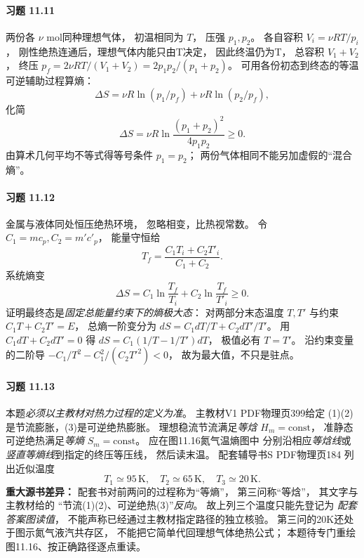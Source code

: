 \paragraph{习题 11.11}
两份各 \(\nu\) mol同种理想气体，
初温相同为 \(T\)，
压强 \(p_1,p_2\)。
各自容积 \(V_i=\nu RT/p_i\)，
刚性绝热连通后，理想气体内能只由T决定，
因此终温仍为T，
总容积 \(V_1+V_2\)，
终压
\(p_f=2\nu RT/(V_1+V_2)
 =2p_1p_2/(p_1+p_2)\)。
可用各份初态到终态的等温可逆辅助过程算熵：
\[
 \Delta S=\nu R\ln(p_1/p_f)
 +\nu R\ln(p_2/p_f),
\]
化简
\[
 \boxed{\Delta S=\nu R
 \ln\frac{(p_1+p_2)^2}{4p_1p_2}\ge0}.
\]
由算术几何平均不等式得等号条件 \(p_1=p_2\)；
两份气体相同不能另加虚假的“混合熵”。

\paragraph{习题 11.12}
金属与液体同处恒压绝热环境，
忽略相变，比热视常数。
令 \(C_1=mc_p,C_2=m'c'_p\)，
能量守恒给
\[
 \boxed{T_f=\frac{C_1T_i+C_2T'_i}{C_1+C_2}}.
\]
系统熵变
\[
 \boxed{\Delta S=C_1\ln\frac{T_f}{T_i}
 +C_2\ln\frac{T_f}{T'_i}\ge0}.
\]
证明最终态是\emph{固定总能量约束下的熵极大态}：
对两部分末态温度 \(T,T'\) 与约束
\(C_1T+C_2T'=E\)，
总熵一阶变分为
\(dS=C_1dT/T+C_2dT'/T'\)。
用 \(C_1dT+C_2dT'=0\) 得
\(dS=C_1(1/T-1/T')dT\)，
极值必有 \(T=T'\)。
沿约束变量的二阶导
\(-C_1/T^2-C_1^2/(C_2T'^2)<0\)，
故为最大值，不只是驻点。

\paragraph{习题 11.13}
本题\emph{必须以主教材对热力过程的定义为准}。
主教材V1 PDF物理页399给定
(1)(2)是节流膨胀，(3)是可逆绝热膨胀。
理想稳流节流满足\emph{等焓}
\(H_m=\mathrm{const}\)，
准静态可逆绝热满足\emph{等熵}
\(S_m=\mathrm{const}\)。
应在图11.16氮气温熵图中
分别沿相应\emph{等焓线}或
\emph{竖直等熵线}到指定的终压等压线，
然后读末温。
配套辅导书S PDF物理页184
列出近似温度
\[
 \boxed{T_1\simeq95\,\mathrm K,\quad
 T_2\simeq65\,\mathrm K,\quad
 T_3\simeq20\,\mathrm K}.
\]
\textbf{重大源书差异：}
配套书对前两问的过程称为“等熵”，
第三问称“等焓”，
其文字与主教材给的
“节流(1)(2)、可逆绝热(3)”\emph{反向}。
故上列三个温度只能先登记为
\emph{配套答案图读值}，
不能声称已经通过主教材指定路径的独立核验。
第三问的20K还处于图示氮气液汽共存区，
不能把它简单代回理想气体绝热公式；
本题待专门重绘图11.16、按正确路径逐点重读。
